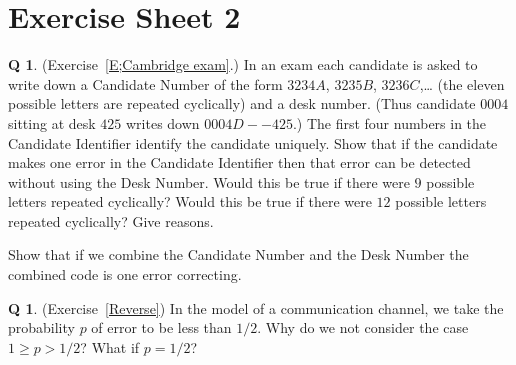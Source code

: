 \documentclass[12pt,a4paper]{article}
\theoremstyle{plain}
\theoremstyle{definition}
\newtheorem{question}[theorem]{Q}
\begin{document}
\section{Exercise Sheet 2}
\begin{question}\label{C2.1}(Exercise~\ref{E;Cambridge exam}.)
In an exam
each candidate is asked to write down a Candidate Number of the
form $3234A$, $3235B$, $3236C$,\dots 
(the eleven possible letters are repeated cyclically)
and a desk number. (Thus candidate $0004$ sitting at desk $425$
writes down $0004D--425$.)
The first four numbers
in the Candidate Identifier identify the candidate
uniquely. 
Show that if the candidate makes one error
in the Candidate Identifier
then that error can be detected
without using the Desk Number.
Would this be true if there were $9$ possible
letters repeated cyclically? Would this be true
if there were $12$ possible
letters repeated cyclically?
Give reasons.

Show that if we combine the Candidate Number and
the Desk Number the combined code is one error correcting.
\end{question}
\begin{question}\label{C2.2}
(Exercise~\ref{Reverse}) In the model of a communication
channel, we take the probability $p$ of error
to be less than $1/2$.
Why do we not consider
the case $1\geq p>1/2$? What
if $p=1/2$?
\end{question}
\end{document}
